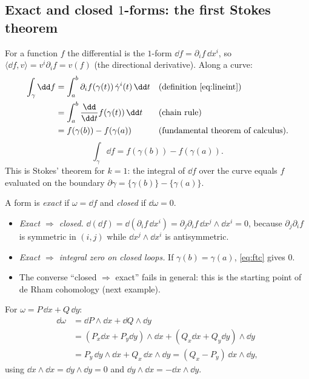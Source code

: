 \subsection{Exact and closed $1$-forms: the first Stokes theorem}\label{sec:expl-closed}

For a function $f$ the differential is the $1$-form $\dd f=\partial_if\,\dd x^i$, so $\langle\dd f,v\rangle=v^i\partial_if=v(f)$ (the directional derivative). Along a curve:
\begin{align*}
\int_\gamma\dd f&=\int_a^b\partial_if(\gamma(t))\,\dot\gamma^i(t)\,\dd t &&\text{(definition \eqref{eq:lineint})}\\
&=\int_a^b\frac{\dd}{\dd t}f(\gamma(t))\,\dd t &&\text{(chain rule)}\\
&=f(\gamma(b))-f(\gamma(a)) &&\text{(fundamental theorem of calculus).}
\end{align*}
\begin{equation}\label{eq:ftc}
\int_\gamma\dd f=f(\gamma(b))-f(\gamma(a)).
\end{equation}
This is Stokes' theorem for $k=1$: the integral of $\dd f$ over the curve equals $f$ evaluated on the boundary $\partial\gamma=\{\gamma(b)\}-\{\gamma(a)\}$.

A form is \emph{exact} if $\omega=\dd f$ and \emph{closed} if $\dd\omega=0$.
\begin{itemize}
\item \emph{Exact $\Rightarrow$ closed.} $\dd(\dd f)=\dd(\partial_if\,\dd x^i)=\partial_j\partial_if\,\dd x^j\wedge\dd x^i=0$, because $\partial_j\partial_if$ is symmetric in $(i,j)$ while $\dd x^j\wedge\dd x^i$ is antisymmetric.
\item \emph{Exact $\Rightarrow$ integral zero on closed loops.} If $\gamma(b)=\gamma(a)$, \eqref{eq:ftc} gives $0$.
\item The converse ``closed $\Rightarrow$ exact'' fails in general: this is the starting point of de Rham cohomology (next example).
\end{itemize}

For $\omega=P\,\dd x+Q\,\dd y$:
\begin{align*}
\dd\omega&=\dd P\wedge\dd x+\dd Q\wedge\dd y\\
&=(P_x\dd x+P_y\dd y)\wedge\dd x+(Q_x\dd x+Q_y\dd y)\wedge\dd y\\
&=P_y\,\dd y\wedge\dd x+Q_x\,\dd x\wedge\dd y=(Q_x-P_y)\,\dd x\wedge\dd y,
\end{align*}
using $\dd x\wedge\dd x=\dd y\wedge\dd y=0$ and $\dd y\wedge\dd x=-\dd x\wedge\dd y$.

